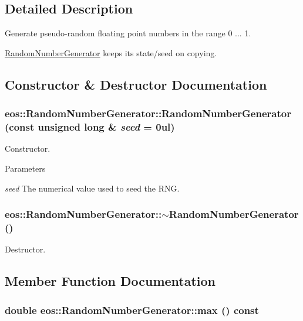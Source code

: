 \subsection{Detailed Description}
Generate pseudo-\/random floating point numbers in the range 0 ... 1.

\hyperlink{classeos_1_1RandomNumberGenerator}{RandomNumberGenerator} keeps its state/seed on copying. 

\subsection{Constructor \& Destructor Documentation}
\hypertarget{classeos_1_1RandomNumberGenerator_a661f2b9c129ddd7a1c23f463ef4ec5b7}{
\subsubsection[{RandomNumberGenerator}]{\setlength{\rightskip}{0pt plus 5cm}eos::RandomNumberGenerator::RandomNumberGenerator (const unsigned long \& {\em seed} = {\ttfamily 0ul})}}
\label{classeos_1_1RandomNumberGenerator_a661f2b9c129ddd7a1c23f463ef4ec5b7}
Constructor.


\begin{DoxyParams}{Parameters}
\item[{\em seed}]The numerical value used to seed the RNG. \end{DoxyParams}
\hypertarget{classeos_1_1RandomNumberGenerator_a379d4e110cdf0ded2e930e2e7ffa59a1}{
\subsubsection[{$\sim$RandomNumberGenerator}]{\setlength{\rightskip}{0pt plus 5cm}eos::RandomNumberGenerator::$\sim$RandomNumberGenerator ()}}
\label{classeos_1_1RandomNumberGenerator_a379d4e110cdf0ded2e930e2e7ffa59a1}


Destructor. 

\subsection{Member Function Documentation}
\hypertarget{classeos_1_1RandomNumberGenerator_adac254d76323261e06d42b2f48e05c50}{
\subsubsection[{max}]{\setlength{\rightskip}{0pt plus 5cm}double eos::RandomNumberGenerator::max () const}}
\label{classeos_1_1RandomNumberGenerator_adac254d76323261e06d42b2f48e05c50}



